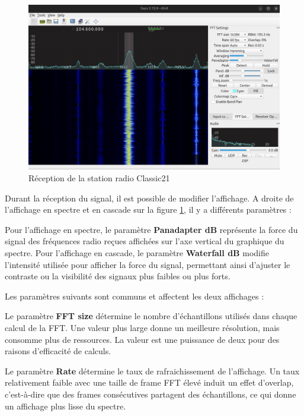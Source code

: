 \newpage

\begin{figure}[h]
\centering

\includegraphics[scale=0.18]{images/gqrx1.png}
\caption{Réception de la station radio Classic21}\label{term38}
\end{figure}

Durant la réception du signal, il est possible de modifier l'affichage. A droite de l'affichage en spectre et en cascade sur la figure \ref{term38}, il y a différents paramètres :

Pour l'affichage en spectre, le paramètre \textbf{Panadapter dB} représente la force du signal des fréquences radio reçues affichées sur l'axe vertical du graphique du spectre. Pour l'affichage en cascade, le paramètre \textbf{Waterfall dB} modifie l'intensité utilisée pour afficher la force du signal, permettant ainsi d'ajuster le contraste ou la visibilité des signaux plus faibles ou plus forts. 

\vspace{0.1cm}

Les paramètres suivants sont communs et affectent les deux affichages :

\vspace{0.1cm}

Le paramètre \textbf{FFT size} détermine le nombre d'échantillons utilisés dans chaque calcul de la \ac{FFT}. Une valeur plus large donne un meilleure résolution, mais consomme plus de ressources. La valeur est une puissance de deux pour des raisons d'efficacité de calculs.

\vspace{0.1cm}

Le paramètre \textbf{Rate} détermine le taux de rafraichissement de l'affichage. Un taux relativement faible avec une taille de frame \ac{FFT} élevé induit un effet d'overlap, c'est-à-dire que des frames consécutives partagent des échantillons, ce qui donne un affichage plus lisse du spectre.


